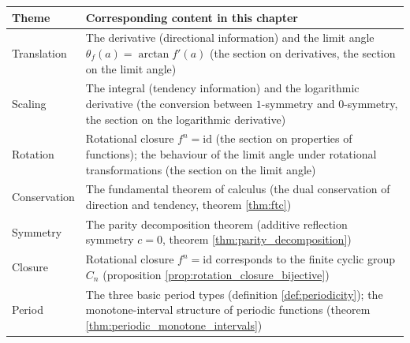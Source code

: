 \begingroup
\begin{longtable}{>{\raggedright\arraybackslash}p{3cm}>{\raggedright\arraybackslash}p{10.5cm}}
\toprule
Theme & Corresponding content in this chapter \\
\midrule
Translation & The derivative (directional information) and the limit angle $\theta_f(a)=\arctan f'(a)$ (the section on derivatives, the section on the limit angle) \\
Scaling & The integral (tendency information) and the logarithmic derivative (the conversion between $1$-symmetry and $0$-symmetry, the section on the logarithmic derivative) \\
Rotation & Rotational closure $f^n=\text{id}$ (the section on properties of functions); the behaviour of the limit angle under rotational transformations (the section on the limit angle) \\
Conservation & The fundamental theorem of calculus (the dual conservation of direction and tendency, theorem \ref{thm:ftc}) \\
Symmetry & The parity decomposition theorem (additive reflection symmetry $c=0$, theorem \ref{thm:parity_decomposition}) \\
Closure & Rotational closure $f^n=\text{id}$ corresponds to the finite cyclic group $C_n$ (proposition \ref{prop:rotation_closure_bijective}) \\
Period & The three basic period types (definition \ref{def:periodicity}); the monotone-interval structure of periodic functions (theorem \ref{thm:periodic_monotone_intervals}) \\
\bottomrule
\end{longtable}
\endgroup

